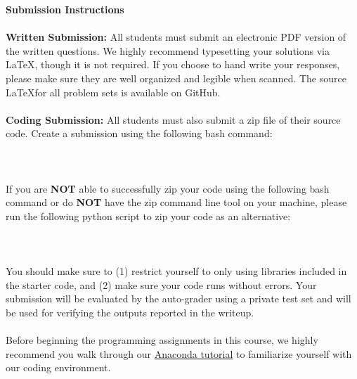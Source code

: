{\bf Submission Instructions} \\~\\
{\bf Written Submission:}
All students must submit an electronic PDF version of the written questions. We highly recommend typesetting your solutions via \LaTeX, though it is not required. If you choose to hand write your responses, please make sure they are well organized and legible when scanned. The source \LaTeX for all problem sets is available on GitHub.\\~\\
{\bf Coding Submission:}
All students must also submit a zip file of their source code.
Create a submission using the following bash command:\\\\
\small{\zipscript}\\\\ 
If you are \textbf{NOT} able to successfully zip your code using the following bash command or do \textbf{NOT} have the zip command line tool on your machine, please run the following python script to zip your code as an alternative: \\\\
\small{\zipscriptalt}\\\\
You should make sure to (1) restrict yourself to only using libraries included in the starter code, and (2) make sure your code runs without errors.
Your submission will be evaluated by the auto-grader using a private test set and will be used for verifying the outputs reported in the writeup.\\\\
Before beginning the programming assignments in this course, we highly recommend you walk through our \href{https://learning.stanford.edu/online/pluginfile.php/112146/mod_resource/content/18/Conda_Tutorial.pdf}{Anaconda tutorial} to familiarize yourself with our coding environment.\\~\\~\\